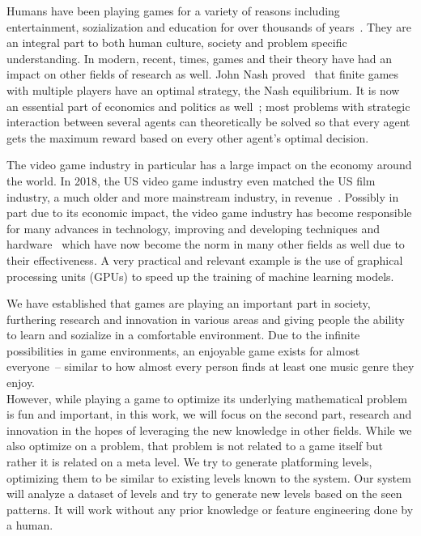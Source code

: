 Humans have been playing games for a variety of reasons including
entertainment, sozialization and education for over thousands of
years~\cite{HistoryGames2019}. They are an integral part to both human
culture, society and problem specific understanding. In modern,
recent, times, games and their theory have had an impact on other
fields of research as well. John Nash
proved~\cite{NashEquilibrium2019} that finite games with multiple
players have an optimal strategy, the Nash equilibrium. It is now an
essential part of economics and politics as
well~\cite{NashEquilibrium2019}; most problems with strategic
interaction between several agents can theoretically be solved so that
every agent gets the maximum reward based on every other agent's
optimal decision.

The video game industry in particular has a large impact on the
economy around the world. In 2018, the US video game industry even
matched the US film industry, a much older and more mainstream
industry, in revenue~\cite{VideoGameIndustry2019}. Possibly in part
due to its economic impact, the video game industry has become
responsible for many advances in technology, improving and developing
techniques and hardware~\cite{VideoGameIndustry2019} which have now
become the norm in many other fields as well due to their
effectiveness. A very practical and relevant example is the use of
graphical processing units (GPUs) to speed up the training of machine
learning models.

We have established that games are playing an important part in
society, furthering research and innovation in various areas and
giving people the ability to learn and sozialize in a comfortable
environment. Due to the infinite possibilities in game environments,
an enjoyable game exists for almost everyone~-- similar to how almost
every person finds at least one music genre they enjoy. \\
However, while playing a game to optimize its underlying mathematical
problem is fun and important, in this work, we will focus on the
second part, research and innovation in the hopes of leveraging the
new knowledge in other fields. While we also optimize on a problem,
that problem is not related to a game itself but rather it is related
on a meta level. We try to generate platforming levels, optimizing
them to be similar to existing levels known to the system. Our system
will analyze a dataset of levels and try to generate new levels based
on the seen patterns. It will work without any prior knowledge or
feature engineering done by a human.


